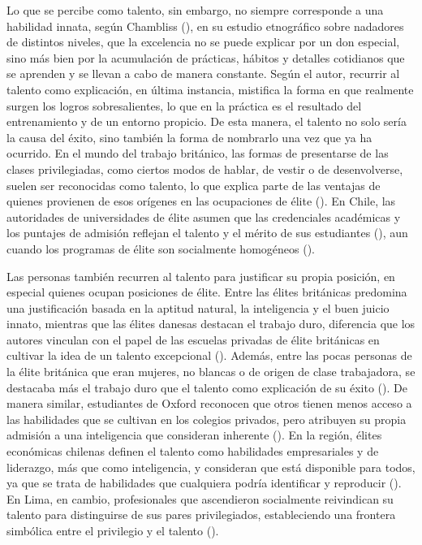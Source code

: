 \documentclass[
  spanish,
  a4paper,
  oneside]{scrbook}
\begin{document}
Lo que se percibe como talento, sin embargo, no siempre corresponde a
una habilidad innata, según Chambliss
(), en su estudio
etnográfico sobre nadadores de distintos niveles, que la excelencia no
se puede explicar por un don especial, sino más bien por la acumulación
de prácticas, hábitos y detalles cotidianos que se aprenden y se llevan
a cabo de manera constante. Según el autor, recurrir al talento como
explicación, en última instancia, mistifica la forma en que realmente
surgen los logros sobresalientes, lo que en la práctica es el resultado
del entrenamiento y de un entorno propicio. De esta manera, el talento
no solo sería la causa del éxito, sino también la forma de nombrarlo una
vez que ya ha ocurrido. En el mundo del trabajo británico, las formas de
presentarse de las clases privilegiadas, como ciertos modos de hablar,
de vestir o de desenvolverse, suelen ser reconocidas como talento, lo
que explica parte de las ventajas de quienes provienen de esos orígenes
en las ocupaciones de élite
(). En
Chile, las autoridades de universidades de élite asumen que las
credenciales académicas y los puntajes de admisión reflejan el talento y
el mérito de sus estudiantes
(), aun cuando los programas de élite son socialmente
homogéneos ().

Las personas también recurren al talento para justificar su propia
posición, en especial quienes ocupan posiciones de élite. Entre las
élites británicas predomina una justificación basada en la aptitud
natural, la inteligencia y el buen juicio innato, mientras que las
élites danesas destacan el trabajo duro, diferencia que los autores
vinculan con el papel de las escuelas privadas de élite británicas en
cultivar la idea de un talento excepcional
().
Además, entre las pocas personas de la élite británica que eran mujeres,
no blancas o de origen de clase trabajadora, se destacaba más el trabajo
duro que el talento como explicación de su éxito
().
De manera similar, estudiantes de Oxford reconocen que otros tienen
menos acceso a las habilidades que se cultivan en los colegios privados,
pero atribuyen su propia admisión a una inteligencia que consideran
inherente (). En la región, élites económicas chilenas definen el
talento como habilidades empresariales y de liderazgo, más que como
inteligencia, y consideran que está disponible para todos, ya que se
trata de habilidades que cualquiera podría identificar y reproducir
(). En Lima, en cambio, profesionales que ascendieron
socialmente reivindican su talento para distinguirse de sus pares
privilegiados, estableciendo una frontera simbólica entre el privilegio
y el talento ().
\end{document}

